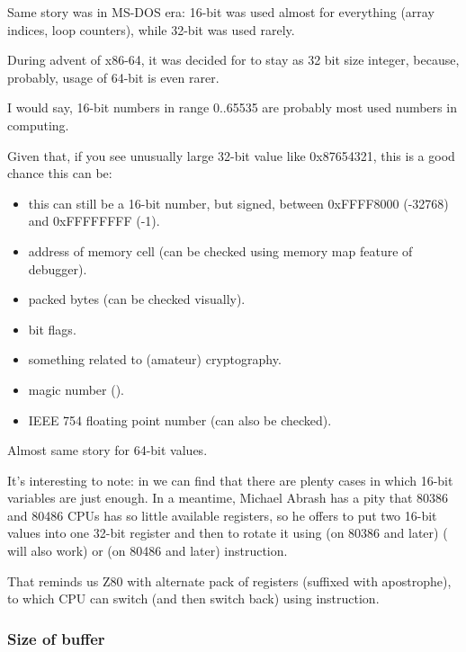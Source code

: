 Same story was in MS-DOS era: 16-bit  was used almost for everything (array indices, loop counters),
while 32-bit  was used rarely.

During advent of x86-64, it was decided for  to stay as 32 bit size integer, because, probably,
usage of 64-bit  is even rarer.

I would say, 16-bit numbers in range 0..65535 are probably most used numbers in computing.

Given that, if you see unusually large 32-bit value like 0x87654321, this is a good chance this can be:

\begin{itemize}

\item this can still be a 16-bit number, but signed, between 0xFFFF8000 (-32768) and 0xFFFFFFFF (-1).
\item address of memory cell (can be checked using memory map feature of debugger).
\item packed bytes (can be checked visually).
\item bit flags.
\item something related to (amateur) cryptography.
\item magic number ().
\item IEEE 754 floating point number (can also be checked).

\end{itemize}

Almost same story for 64-bit values.


It's interesting to note: in 
we can find that there are plenty cases in which 16-bit variables are just enough.
In a meantime, Michael Abrash has a pity that 80386 and 80486 CPUs has so little available registers, so he offers to put
two 16-bit values into one 32-bit register and then to rotate it using
 (on 80386 and later) ( will also work) or 
 (on 80486 and later) instruction.

That reminds us Z80 with alternate pack of registers (suffixed with apostrophe), to which CPU can switch
(and then switch back) using  instruction.

\subsubsection{Size of buffer}

